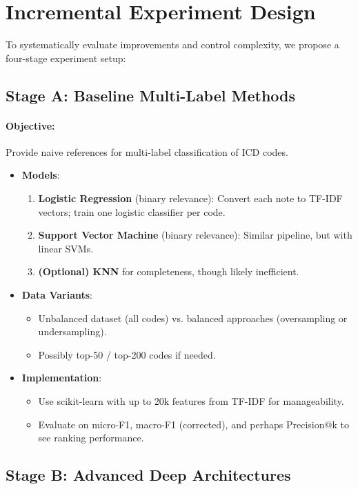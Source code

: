 \documentclass[12pt,a4paper]{report}
\begin{document}
\section{Incremental Experiment Design}

To systematically evaluate improvements and control complexity, we propose a four-stage experiment setup:

\subsection{Stage A: Baseline Multi-Label Methods}
\paragraph{Objective:} Provide naive references for multi-label classification of ICD codes.

\begin{itemize}
    \item \textbf{Models}:
    \begin{enumerate}
        \item \textbf{Logistic Regression} (binary relevance): Convert each note to TF-IDF vectors; train one logistic classifier per code.
        \item \textbf{Support Vector Machine} (binary relevance): Similar pipeline, but with linear SVMs.
        \item \textbf{(Optional) KNN} for completeness, though likely inefficient.
    \end{enumerate}
    \item \textbf{Data Variants}:
    \begin{itemize}
        \item Unbalanced dataset (all codes) vs. balanced approaches (oversampling or undersampling).
        \item Possibly top-50 / top-200 codes if needed.
    \end{itemize}
    \item \textbf{Implementation}:
    \begin{itemize}
        \item Use scikit-learn with up to 20k features from TF-IDF for manageability.
        \item Evaluate on micro-F1, macro-F1 (corrected), and perhaps Precision@k to see ranking performance.
    \end{itemize}
\end{itemize}


\subsection{Stage B: Advanced Deep Architectures}
\end{document}

